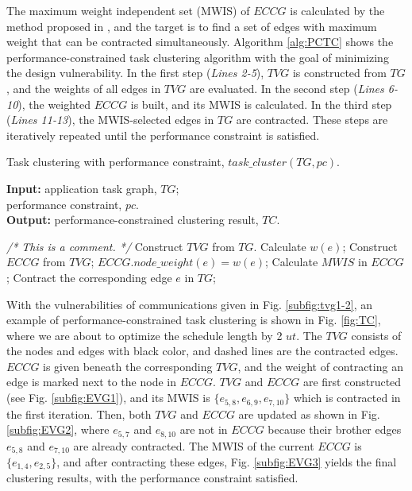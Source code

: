 \documentclass[10pt,journal, compsoc]{IEEEtran}
\begin{document}
The maximum weight independent set (MWIS) of $ECCG$ is calculated by the method proposed in \cite{conference:LC}, and the target is to find a set of edges with maximum weight that can be contracted simultaneously. Algorithm \ref{alg:PCTC} shows the performance-constrained task clustering algorithm with the goal of minimizing the design vulnerability. In the first step (\textit{Lines 2-5}), $TVG$ is constructed from $TG$, and the weights of all edges in $TVG$ are evaluated. In the second step (\textit{Lines 6-10}), the weighted $ECCG$ is built, and its MWIS is calculated. In the third step (\textit{Lines 11-13}), the MWIS-selected edges in $TG$ are contracted. These steps are iteratively repeated until the performance constraint is satisfied.


\begin{algorithm}[!t]
\caption{Task clustering with performance constraint, $task\_cluster(TG, pc)$.}
\label{alg:PCTC}
\begin{flushleft}
{\textbf{Input:}}
application task graph, $TG$;\\
\hspace*{2.8em}performance constraint, $pc$.\\
{\textbf{Output:}} performance-constrained clustering result, $TC$.
\end{flushleft}
\begin{algorithmic}[1]
\STATEx \hspace*{-\algorithmicindent}\textit{/* This is a comment. */}
\STATE Construct $TVG$ from $TG$.
\STATE Calculate $w(e)$;
\ENDFOR
\STATE Construct $ECCG$ from $TVG$;
\STATE $ECCG.node\_weight(e)=w(e)$;
\ENDFOR
\STATE Calculate $MWIS$ in $ECCG$;
    \STATE Contract the corresponding edge $e$ in $TG$;
\ENDFOR
\ENDWHILE
\end{algorithmic}
\end{algorithm}






With the vulnerabilities of communications given in Fig. \ref{subfig:tvg1-2}, an example of performance-constrained task clustering is shown in Fig. \ref{fig:TC}, where we are about to optimize the schedule length by 2 $ut$. The $TVG$ consists of the nodes and edges with black color, and dashed lines are the contracted edges. $ECCG$ is given beneath the corresponding $TVG$, and the weight of contracting an edge is marked next to the node in $ECCG$. $TVG$ and $ECCG$ are first constructed (see Fig. \ref{subfig:EVG1}), and its MWIS is $\{e_{5,8}, e_{6,9}, e_{7,10}\}$ which is contracted in the first iteration. Then, both $TVG$ and $ECCG$ are updated as shown in Fig. \ref{subfig:EVG2}, where $e_{5,7}$ and $e_{8,10}$ are not in $ECCG$ because their brother edges $e_{5,8}$ and $e_{7,10}$ are already contracted. The MWIS of the current $ECCG$ is $\{e_{1,4}, e_{2,5}\}$, and after contracting these edges, Fig. \ref{subfig:EVG3} yields the final clustering results, with the performance constraint satisfied.%
\end{document}
